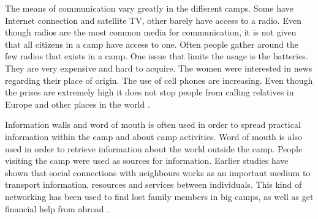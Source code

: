The means of communication vary greatly in the different camps. Some have Internet connection and satellite TV, other barely have access to a radio. Even though radios are the most common media for communication, it is not given that all citizens in a camp have access to one. Often people gather around the few radios that exists in a camp. One issue that limits the usage is the batteries. They are very expensive and hard to acquire. The women were interested in news regarding their place of origin. The use of cell phones are increasing. Even though the prises are extremely high it does not stop people from calling relatives in Europe and other places in the world \cite{womenRefugee}.

Information walls and word of mouth is often used in order to spread practical information within the camp and about camp activities. Word of mouth is also used in order to retrieve information about the world outside the camp. People visiting the camp were used as sources for information. Earlier studies have shown that social connections with neighbours works as an important medium to transport information, resources and services between individuals. This kind of networking has been used to find lost family members in big camps, as well as get financial help from abroad \cite{womenRefugee}.  


